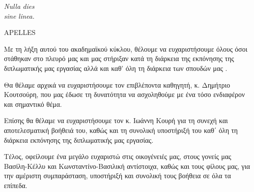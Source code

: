 \clearpage

\thispagestyle{empty}
\null\vfill

\settowidth{}
\begin{center}
	\parbox{\longest}{%
	  \raggedright{\huge\itshape%
	   Nulla dies\\ sine linea.\par\bigskip
	  }   
	  \raggedleft\Large\MakeUppercase{Apelles}\par%
	}
\end{center}
\vfill\vfill

\clearpage


\begin{acknowledgementsgr}
Με τη λήξη αυτού του ακαδημαϊκού κύκλου, θέλουμε να ευχαριστήσουμε όλους όσοι στάθηκαν στο πλευρό μας και μας στήριξαν κατά τη διάρκεια της εκπόνησης της διπλωματικής μας εργασίας αλλά και καθ’ όλη τη διάρκεια των σπουδών μας .

Θα θέλαμε αρχικά να ευχαριστήσουμε τον επιβλέποντα καθηγητή, κ. Δημήτριο Κουτσούρη, που μας έδωσε τη δυνατότητα να ασχοληθούμε με ένα τόσο ενδιαφέρον και σημαντικό θέμα.

Επίσης θα θέλαμε να ευχαριστήσουμε τον κ. Ιωάννη Κουρή για τη συνεχή και αποτελεσματική βοήθειά του, καθώς και τη συνολική υποστήριξή του καθ΄ όλη τη διάρκεια εκπόνησης της διπλωματικής μας εργασίας.

Τέλος, οφείλουμε ένα μεγάλο ευχαριστώ στις οικογένειές μας, στους γονείς μας Βασίλη-Κέλλυ και Κωνσταντίνο-Βασιλική αντίστοιχα, καθώς και τους φίλους μας, για την αμέριστη συμπαράσταση, υποστήριξή και συνολική τους βοήθεια σε όλα τα επίπεδα.
\end{acknowledgementsgr}

